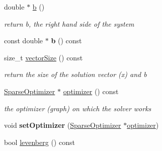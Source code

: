 \begin{DoxyCompactItemize}
\item 
\hypertarget{classg2o_1_1Solver_a3212ad9d80f8f5ad15b72c2b55000095}{double $\ast$ \hyperlink{classg2o_1_1Solver_a3212ad9d80f8f5ad15b72c2b55000095}{b} ()}\label{classg2o_1_1Solver_a3212ad9d80f8f5ad15b72c2b55000095}

\begin{DoxyCompactList}\small\item\em return b, the right hand side of the system \end{DoxyCompactList}\item 
\hypertarget{classg2o_1_1Solver_a9cae6286a8f4b8b93032097cee6cddf6}{const double $\ast$ {\bfseries b} () const }\label{classg2o_1_1Solver_a9cae6286a8f4b8b93032097cee6cddf6}

\item 
\hypertarget{classg2o_1_1Solver_a739e1e7b0888d5f316f1d68cbd21bc2d}{size\-\_\-t \hyperlink{classg2o_1_1Solver_a739e1e7b0888d5f316f1d68cbd21bc2d}{vector\-Size} () const }\label{classg2o_1_1Solver_a739e1e7b0888d5f316f1d68cbd21bc2d}

\begin{DoxyCompactList}\small\item\em return the size of the solution vector (x) and b \end{DoxyCompactList}\item 
\hypertarget{classg2o_1_1Solver_a9ea585f131ab02ae1e0c0192126f0b5f}{\hyperlink{classg2o_1_1SparseOptimizer}{Sparse\-Optimizer} $\ast$ \hyperlink{classg2o_1_1Solver_a9ea585f131ab02ae1e0c0192126f0b5f}{optimizer} () const }\label{classg2o_1_1Solver_a9ea585f131ab02ae1e0c0192126f0b5f}

\begin{DoxyCompactList}\small\item\em the optimizer (graph) on which the solver works \end{DoxyCompactList}\item 
\hypertarget{classg2o_1_1Solver_af27b647cdc19d99ea5378b443e118bb0}{void {\bfseries set\-Optimizer} (\hyperlink{classg2o_1_1SparseOptimizer}{Sparse\-Optimizer} $\ast$\hyperlink{classg2o_1_1Solver_a9ea585f131ab02ae1e0c0192126f0b5f}{optimizer})}\label{classg2o_1_1Solver_af27b647cdc19d99ea5378b443e118bb0}

\item 
\hypertarget{classg2o_1_1Solver_a074069dacd2ac34c895c6f2f333e38d5}{bool \hyperlink{classg2o_1_1Solver_a074069dacd2ac34c895c6f2f333e38d5}{levenberg} () const }\label{classg2o_1_1Solver_a074069dacd2ac34c895c6f2f333e38d5}


\end{DoxyCompactItemize}
